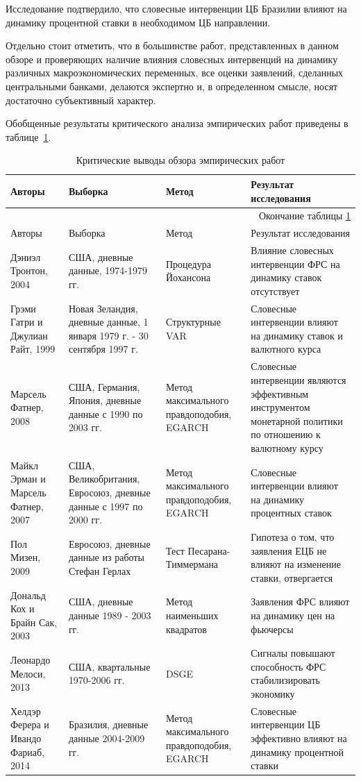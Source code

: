 \documentclass[14pt,a4paper, oneside]{extreport}
\theoremstyle{plain}              %
\theoremstyle{definition}         %
\begin{document}
Исследование подтвердило, что словесные интервенции ЦБ Бразилии влияют на динамику процентной ставки в необходимом ЦБ направлении.

Отдельно стоит отметить, что в большинстве работ, представленных в данном обзоре и  проверяющих наличие влияния словесных интервенций на динамику различных макроэкономических переменных, все оценки заявлений, сделанных центральными банками, делаются экспертно и, в определенном смысле, носят достаточно субъективный характер.

Обобщенные результаты критического анализа эмпирических работ приведены в таблице~\ref{tab1}.


\begin{longtable}{|m{2.5cm}|m{3.5cm}|m{2.5cm}|m{6cm}|}
	\caption{Критические выводы обзора эмпирических работ}\label{tab1}\\
	\hline
	Авторы & Выборка & Метод & Результат исследования \\ 
	\endfirsthead
	\multicolumn{4}{r}{Окончание таблицы \ref{tab1}}\\\hline
	Авторы & Выборка & Метод & Результат исследования \\ \hline
	\endhead
	\hline
	\endfoot
	\hline
	\endlastfoot
\hline
  		Дэниэл Тронтон, 2004 & США, дневные данные, 1974-1979 гг. & Процедура Йохансона & Влияние словесных интервенции ФРС на динамику ставок отсутствует  \\
  		\hline
  		Грэми Гатри и Джулиан Райт, 1999 & Новая Зеландия, дневные данные, 1 января 1979 г. - 30 сентября 1997 г.& Структурные VAR & Словесные интервенции влияют на динамику ставок и валютного курса  \\ 
  		\hline
  		Марсель Фатнер, 2008 & США, Германия, Япония, дневные данные с 1990 по 2003 гг.  & Метод максимального правдоподобия, EGARCH & Словесные интервенции являются эффективным инструментом монетарной политики по отношению к валютному курсу \\ 
  		\hline
  		Майкл Эрман и Марсель Фатнер, 2007 & США, Великобритания, Евросоюз, дневные данные с 1997 по 2000 гг. & Метод максимального правдоподобия, EGARCH & Словесные интервенции влияют на динамику процентных ставок \\ 
  		\hline
  		Пол Мизен, 2009 & Евросоюз, дневные данные из работы Стефан Герлах & Тест Песарана-Тиммермана & Гипотеза о том, что заявления ЕЦБ не влияют на изменение ставки, отвергается  \\
  		\hline
  		Дональд Кох и Брайн Сак, 2003 & США, дневные данные 1989 - 2003 гг. & Метод наименьших квадратов & Заявления ФРС влияют на динамику цен на фьючерсы  \\
  		\hline
  		Леонардо Мелоси, 2013 & США, квартальные 1970-2006 гг. & DSGE & Сигналы повышают способность ФРС стабилизировать экономику  \\
  		\hline
  		Хелдэр Ферера и Ивандо Фариаб, 2014 & Бразилия, дневные данные 2004-2009 гг. &Метод максимального правдоподобия, EGARCH& Словесные интервенции ЦБ эффективно влияют на динамику процентной ставки \\
  		\hline
\end{longtable}
\end{document}
